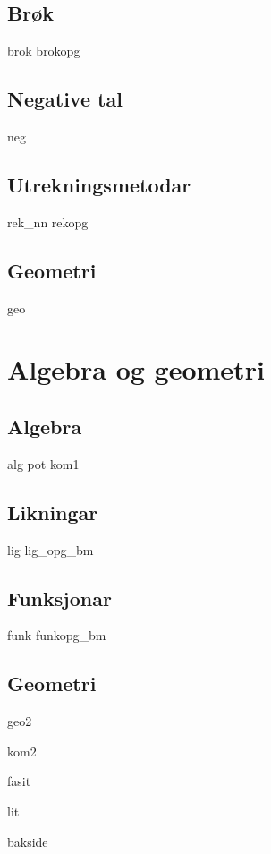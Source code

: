 \chapter{Brøk \label{Brok}}
\newpage
{brok}
\newpage
{brokopg}

\chapter{Negative tal \label{Negtal}}
\newpage
{neg}

\chapter{Utrekningsmetodar \label{Utrekning}}
\newpage
{rek_nn}
\newpage
{rekopg}


\chapter{Geometri}
\newpage
{geo}

\part{Algebra og geometri \label{Del2}}
\chapter{Algebra}
\newpage
{alg}
{pot}
\newpage
{kom1}

\chapter{Likningar \label{Likningar}}
\newpage
{lig}
{lig_opg_bm}

\chapter{Funksjonar \label{Funksjoner}}
{funk}
{funkopg_bm}

\chapter{Geometri}
\newpage
{geo2}

\newpage
{kom2}

\newpage
{}
{}
{fasit}

{lit}
{\printindex {}
	}
{bakside}












